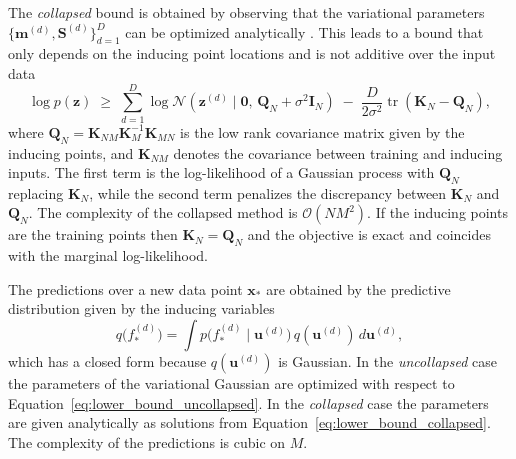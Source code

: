 The \emph{collapsed} bound is obtained by observing that the variational parameters $\{\mathbf m^{(d)},\mathbf S^{(d)}\}_{d=1}^D$ can be optimized analytically \citep{titsias2009variational}. This leads to a bound that only depends on the inducing point locations and is not additive over the input data
\begin{equation}
\log p(\mathbf z)
\;\ge\;
\sum_{d=1}^D
\log \mathcal N\!\left(
\mathbf z^{(d)} \mid \mathbf 0,\,
\mathbf Q_{N}
+ \sigma^2 \mathbf I_N
\right)
\;-\;
\frac{D}{2\sigma^2}
\operatorname{tr}\!\left(
\mathbf K_{N} - \mathbf Q_{N}
\right),
\label{eq:lower_bound_collapsed}
\end{equation}
where $\mathbf Q_{N} = \mathbf K_{NM}\mathbf K_{M}^{-1}\mathbf K_{MN}$ is the low rank covariance matrix given by the inducing points, and $\mathbf K_{NM}$ denotes the covariance between training and inducing inputs. The first term is the log-likelihood of a Gaussian process with $\mathbf{Q}_N$ replacing $\mathbf{K}_N$, while the second term penalizes the discrepancy between $\mathbf K_{N}$ and $\mathbf Q_{N}$. The complexity of the collapsed method is $\mathcal{O}(NM^2)$. If the inducing points are the training points then $\mathbf{K}_N = \mathbf{Q}_N$ and the objective is exact and coincides with the marginal log-likelihood. 

The predictions over a new data point $\boldsymbol{x}_*$ are obtained by the predictive distribution given by the inducing variables
\begin{equation*}
    q\bigl(f_*^{(d)}\bigr)=\int p\bigl(f_*^{(d)}\mid \mathbf u^{(d)}\bigr)\,q(\mathbf u^{(d)})\,d\mathbf u^{(d)},
\end{equation*}
which has a closed form because $q(\mathbf u^{(d)})$ is Gaussian. In the \emph{uncollapsed} case the parameters of the variational Gaussian are optimized with respect to Equation~\ref{eq:lower_bound_uncollapsed}. In the \emph{collapsed} case the parameters are given analytically as solutions from Equation~\ref{eq:lower_bound_collapsed}. The complexity of the predictions is cubic on $M$.

